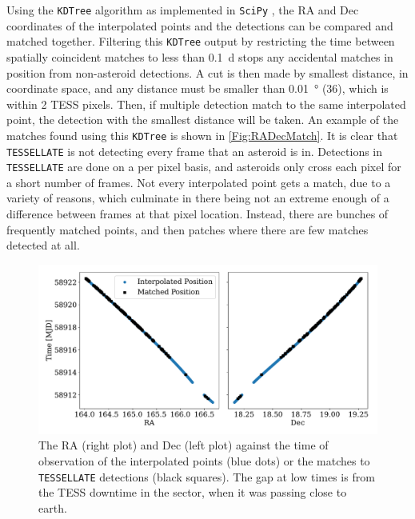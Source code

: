 \documentclass{UCreport}
\begin{document}
Using the \texttt{KDTree} algorithm \citep{Maneewongvatana1999} as implemented in \texttt{SciPy} \citep{2020SciPy-NMeth}, the RA and Dec coordinates of the interpolated points and the detections can be compared and matched together.
Filtering this \texttt{KDTree} output by restricting the time between spatially coincident matches to less than \qty{0.1}{\day} stops any accidental matches in position from non-asteroid detections.
A cut is then made by smallest distance, in coordinate space, and any distance must be smaller than \qty{0.01}{\degree} (\qty{36}{\arcsec}), which is within 2 TESS pixels.
Then, if multiple detection match to the same interpolated point, the detection with the smallest distance will be taken.
An example of the matches found using this \texttt{KDTree} is shown in \autoref{Fig:RADecMatch}.
It is clear that \texttt{TESSELLATE} is not detecting every frame that an asteroid is in.
Detections in \texttt{TESSELLATE} are done on a per pixel basis, and asteroids only cross each pixel for a short number of frames.
Not every interpolated point gets a match, due to a variety of reasons, which culminate in there being not an extreme enough of a difference between frames at that pixel location.
Instead, there are bunches of frequently matched points, and then patches where there are few matches detected at all.


\begin{figure}[]
  \centering
  \includegraphics[width =\textwidth]{../Test Code/Testing Figures/DetectMatchPos.pdf}
  \caption[Interpolated and Detected Positions]{The RA (right plot) and Dec (left plot) against the time of observation of the interpolated points (blue dots) or the matches to \texttt{TESSELLATE} detections (black squares). The gap at low times is from the TESS downtime in the sector, when it was passing close to earth.}
  \label{Fig:RADecMatch}
\end{figure}
\end{document}
